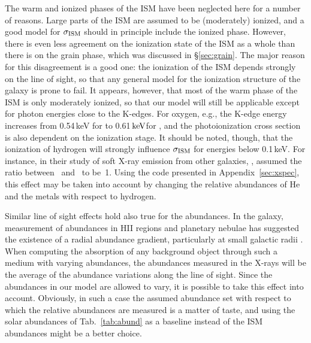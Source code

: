 \documentclass{aastex}
\newcommand{\keV}{\ensuremath{\rm keV}}
\newcommand{\sigism}{\ensuremath{\sigma_{\rm ISM}}}
\begin{document}
The warm and ionized phases of the ISM have been neglected here
for a number of reasons. Large parts of the ISM are assumed to be
(moderately) ionized, and a good model for $\sigism$ should in
principle include the ionized phase. However, there is even less
agreement on the ionization state of the ISM as a whole than
there is on the grain phase, which was discussed in
\S\ref{sec:grain}.  The major reason for this disagreement is a
good one: the ionization of the ISM depends strongly on the line
of sight, so that any general model for the ionization structure
of the galaxy is prone to fail.  It appears, however, that most
of the warm phase of the ISM is only moderately ionized, so that
our model will still be applicable except for photon energies
close to the K-edges. For oxygen, e.g., the K-edge energy
increases from 0.54\,keV for  to 0.61\,\keV for
, and the photoionization cross section is also
dependent on the ionization stage.  It should be noted, though,
that the ionization of hydrogen will strongly influence $\sigism$
for energies below 0.1\,keV. For instance, in their study of soft
X-ray emission from other galaxies, \citep{cui:96b}, assumed the
ratio between~ and~ to be~1.  Using the code
presented in Appendix~\ref{sec:xspec}, this effect may be taken
into account by changing the relative abundances of He and the
metals with respect to hydrogen.

Similar line of sight effects hold also true for the abundances. In
the galaxy, measurement of abundances in HII regions and planetary 
nebulae has suggested the existence of a radial abundance gradient,
particularly at small galactic radii \citep[and references therein]
{rana:91a,kaufer:94a}.  When computing the absorption of any background
object through such a medium with varying abundances, the abundances
measured in the X-rays will be the average of the abundance variations
along the line of sight. Since the abundances in our model are allowed to
vary, it is possible to take this effect into account. Obviously, in such a
case the assumed abundance set with respect to which the relative
abundances are measured is a matter of taste, and using the solar
abundances of Tab.~\ref{tab:abund} as a baseline instead of the ISM
abundances might be a better choice.
\end{document}
